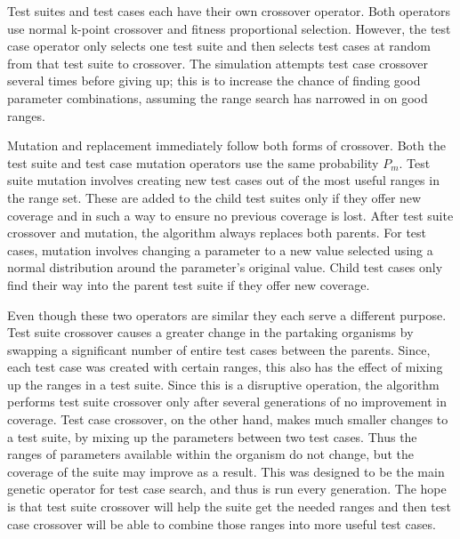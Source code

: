 \documentclass[runningheads]{llncs}
\begin{document}
Test suites and test cases each have their own crossover operator. Both operators use normal k-point crossover and fitness proportional selection. However, the test case operator only selects one test suite and then selects test cases at random from that test suite to crossover. The simulation attempts test case crossover several times before giving up; this is to increase the chance of finding good parameter combinations, assuming the range search has narrowed in on good ranges.

Mutation and replacement immediately follow both forms of crossover. Both the test suite and test case mutation operators use the same probability $P_m$. Test suite mutation involves creating new test cases out of the most useful ranges in the range set. These are added to the child test suites only if they offer new coverage and in such a way to ensure no previous coverage is lost. After test suite crossover and mutation, the algorithm always replaces both parents. For test cases, mutation involves changing a parameter to a new value selected using a normal distribution around the parameter's original value. Child test cases only find their way into the parent test suite if they offer new coverage. 

Even though these two operators are similar they each serve a different purpose. Test suite crossover causes a greater change in the partaking organisms by swapping a significant number of entire test cases between the parents. Since, each test case was created with certain ranges, this also has the effect of mixing up the ranges in a test suite. Since this is a disruptive operation, the algorithm performs test suite crossover only after several generations of no improvement in coverage. Test case crossover, on the other hand, makes much smaller changes to a test suite, by mixing up the parameters between two test cases. Thus the ranges of parameters available within the organism do not change, but the coverage of the suite may improve as a result. This was designed to be the main genetic operator for test case search, and thus is run every generation. The hope is that test suite crossover will help the suite get the needed ranges and then test case crossover will be able to combine those ranges into more useful test cases.
\end{document}
